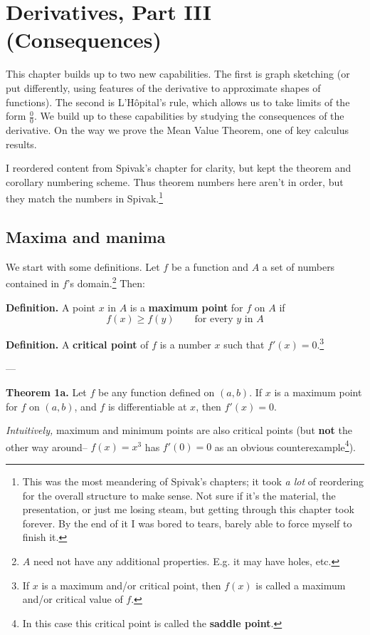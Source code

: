 
\section{Derivatives, Part III (Consequences)}

This chapter builds up to two new capabilities. The first is graph
sketching (or put differently, using features of the derivative to
approximate shapes of functions). The second is L'H\^opital's rule,
which allows us to take limits of the form $\frac{0}{0}$. We build up
to these capabilities by studying the consequences of the derivative.
On the way we prove the Mean Value Theorem, one of key calculus
results.

\vs

I reordered content from Spivak's chapter for clarity, but kept the
theorem and corollary numbering scheme. Thus theorem numbers here
aren't in order, but they match the numbers in Spivak.\footnote{This
  was the most meandering of Spivak's chapters; it took \textit{a lot}
  of reordering for the overall structure to make sense. Not sure if
  it's the material, the presentation, or just me losing steam, but
  getting through this chapter took forever. By the end of it I was
  bored to tears, barely able to force myself to finish it.}

\subsection{Maxima and manima}
We start with some definitions. Let $f$ be a function and $A$ a set of
numbers contained in $f$'s domain.\footnote{$A$ need not have any
  additional properties. E.g. it may have holes, etc.} Then:

\vs

\textbf{Definition.} A point $x$ in $A$ is a \textbf{maximum
  point} for $f$ on $A$ if
\[f(x)\geq f(y)\qquad\text{for every $y$ in $A$}\]

\textbf{Definition.} A \textbf{critical point} of $f$ is a number $x$
such that $f'(x)=0$.\footnote{If $x$ is a maximum and/or critical
  point, then $f(x)$ is called a maximum and/or critical value of
  $f$.}

\vs---\vs

\textbf{Theorem 1a.} Let $f$ be any function defined on $(a,b)$. If $x$
is a maximum point for $f$ on $(a,b)$, and $f$ is differentiable at
$x$, then $f'(x)=0$.

\vs

\textit{Intuitively,} maximum and minimum points are also critical
points (but \textbf{not} the other way around-- $f(x)=x^3$ has
$f'(0)=0$ as an obvious counterexample\footnote{In this case this
  critical point is called the \textbf{saddle point}.}).

